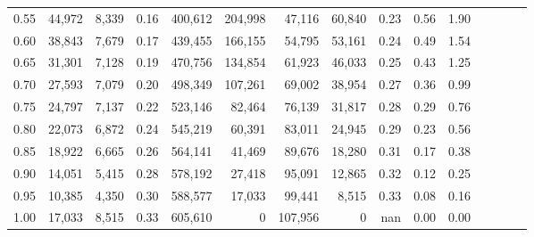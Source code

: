 \begin{tabular}{rrrcrrrrrrrrrrr}
0.55 &  44,972 &  8,339 &                                       0.16 &  400,612 &  204,998 &   47,116 &   60,840 &  0.23 &  0.56 &                         1.90 \\
0.60 &  38,843 &  7,679 &                                       0.17 &  439,455 &  166,155 &   54,795 &   53,161 &  0.24 &  0.49 &                         1.54 \\
0.65 &  31,301 &  7,128 &                                       0.19 &  470,756 &  134,854 &   61,923 &   46,033 &  0.25 &  0.43 &                         1.25 \\
0.70 &  27,593 &  7,079 &                                       0.20 &  498,349 &  107,261 &   69,002 &   38,954 &  0.27 &  0.36 &                         0.99 \\
0.75 &  24,797 &  7,137 &                                       0.22 &  523,146 &   82,464 &   76,139 &   31,817 &  0.28 &  0.29 &                         0.76 \\
0.80 &  22,073 &  6,872 &                                       0.24 &  545,219 &   60,391 &   83,011 &   24,945 &  0.29 &  0.23 &                         0.56 \\
0.85 &  18,922 &  6,665 &                                       0.26 &  564,141 &   41,469 &   89,676 &   18,280 &  0.31 &  0.17 &                         0.38 \\
0.90 &  14,051 &  5,415 &                                       0.28 &  578,192 &   27,418 &   95,091 &   12,865 &  0.32 &  0.12 &                         0.25 \\
0.95 &  10,385 &  4,350 &                                       0.30 &  588,577 &   17,033 &   99,441 &    8,515 &  0.33 &  0.08 &                         0.16 \\
1.00 &  17,033 &  8,515 &                                       0.33 &  605,610 &        0 &  107,956 &        0 &   nan &  0.00 &                         0.00 \\
\bottomrule
\end{tabular}
